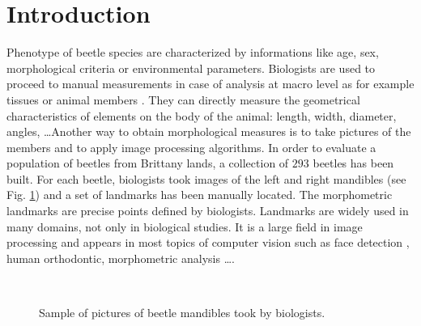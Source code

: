 \documentclass[twoside,twocolumn,10pt]{article}
\begin{document}


\section{Introduction}

\copyrightspace
  Phenotype of beetle species are characterized by informations like
  age, sex, morphological criteria or environmental parameters. Biologists are
  used to proceed to manual measurements in case of
  analysis at macro level as for example tissues or animal members
  \cite{houle2003automated} \cite{bromiley2014semi}.
  They can directly measure the geometrical characteristics of elements on the body of the animal: length,
  width, diameter, angles, \ldots Another way to obtain morphological
  measures is to take pictures of the members and to apply image processing algorithms. In order to
  evaluate a population of beetles from Brittany lands, a collection of
  $293$ beetles has been built. For each beetle, biologists took images of the left
  and right mandibles (see Fig. \ref{figparts}) and a set of landmarks has been manually located. The
  morphometric landmarks are precise points defined by
  biologists. Landmarks are widely used in many domains, not only in
  biological studies. It is a large field in image processing
  \cite{li09} and
  appears in  most topics of computer vision such as face detection \cite{zhang2014facial},
  human orthodontic\cite{favaedi2010cephalometric}, morphometric
  analysis \cite{bec03} \ldots .

\begin{figure}[h]
\centering
{}~~
\caption{Sample of pictures of beetle mandibles took by biologists.}
\label{figparts}
\end{figure}
\end{document}
